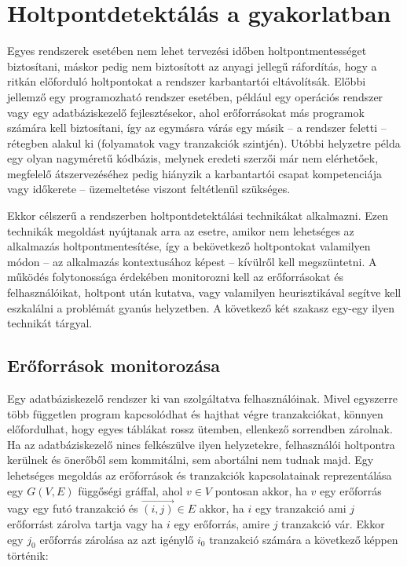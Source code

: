 \section{Holtpontdetektálás a gyakorlatban} 
\label{sec:dl-avoiding}

Egyes rendszerek esetében nem lehet tervezési időben holtpontmentességet biztosítani, máskor pedig nem biztosított az anyagi jellegű ráfordítás, hogy a ritkán előforduló holtpontokat a rendszer karbantartói eltávolítsák. Előbbi jellemző egy programozható rendszer esetében, például egy operációs rendszer vagy egy adatbáziskezelő fejlesztésekor, ahol erőforrásokat más programok számára kell biztosítani, így az egymásra várás egy másik -- a rendszer feletti -- rétegben alakul ki (folyamatok vagy tranzakciók szintjén). Utóbbi helyzetre példa egy olyan nagyméretű kódbázis, melynek eredeti szerzői már nem elérhetőek, megfelelő átszervezéséhez pedig hiányzik a karbantartói csapat kompetenciája vagy időkerete -- üzemeltetése viszont feltétlenül szükséges.

    Ekkor célszerű a rendszerben holtpontdetektálási technikákat alkalmazni. Ezen technikák megoldást nyújtanak arra az esetre, amikor nem lehetséges az alkalmazás holtpontmentesítése, így a bekövetkező holtpontokat valamilyen módon -- az alkalmazás kontextusához képest -- kívülről kell megszüntetni. A működés folytonossága érdekében monitorozni kell az erőforrásokat és felhasználóikat, holtpont után kutatva, vagy valamilyen heurisztikával segítve kell eszkalálni a problémát gyanús helyzetben. A következő két szakasz egy-egy ilyen technikát tárgyal.

    \subsection{Erőforrások monitorozása} 
    Egy adatbáziskezelő rendszer ki van szolgáltatva felhasználóinak. Mivel egyszerre több független program kapcsolódhat és hajthat végre tranzakciókat, könnyen előfordulhat, hogy egyes táblákat rossz ütemben, ellenkező sorrendben zárolnak. Ha az adatbáziskezelő nincs felkészülve ilyen helyzetekre, felhasználói holtpontra kerülnek és önerőből sem kommitálni, sem abortálni nem tudnak majd. Egy lehetséges megoldás az erőforrások és tranzakciók kapcsolatainak reprezentálása egy $G(V, E)$ függőségi gráffal, ahol $v \in V$  pontosan akkor, ha $v$ egy erőforrás vagy egy futó tranzakció és $\overrightarrow{(i, j)} \in E$ akkor, ha $i$ egy tranzakció ami $j$ erőforrást zárolva tartja vagy ha $i$ egy erőforrás, amire $j$ tranzakció vár. Ekkor egy $j_0$ erőforrás zárolása az azt igénylő $i_0$ tranzakció számára a következő képpen történik:
    
